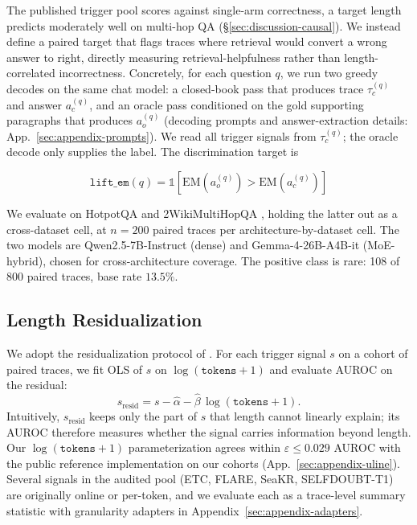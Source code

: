 \documentclass[11pt]{article}
\begin{document}
The published trigger pool scores against single-arm correctness, a target length predicts moderately well on multi-hop QA (\S\ref{sec:discussion-causal}). We instead define a paired target that flags traces where retrieval would convert a wrong answer to right, directly measuring retrieval-helpfulness rather than length-correlated incorrectness. Concretely, for each question $q$, we run two greedy decodes on the same chat model: a closed-book pass that produces trace $\tau_c^{(q)}$ and answer $a_c^{(q)}$, and an oracle pass conditioned on the gold supporting paragraphs that produces $a_o^{(q)}$ (decoding prompts and answer-extraction details: App.~\ref{sec:appendix-prompts}). We read all trigger signals from $\tau_c^{(q)}$; the oracle decode only supplies the label. The discrimination target is

\begin{equation}
\texttt{lift\_em}(q) = \mathbb{1}\!\left[\mathrm{EM}(a_o^{(q)}) > \mathrm{EM}(a_c^{(q)})\right]
\label{eq:lift-em}
\end{equation}

We evaluate on HotpotQA \citep{yang_hotpotqa_2018} and 2WikiMultiHopQA \citep{ho_constructing_2020}, holding the latter out as a cross-dataset cell, at $n{=}200$ paired traces per architecture-by-dataset cell. The two models are Qwen2.5-7B-Instruct (dense) and Gemma-4-26B-A4B-it (MoE-hybrid), chosen for cross-architecture coverage. The positive class is rare: 108 of 800 paired traces, base rate $13.5\%$.

\subsection{Length Residualization}
\label{sec:methods-residualization}

We adopt the residualization protocol of \citet{vashurin_uncertainty-line_2025}. For each trigger signal $s$ on a cohort of paired traces, we fit OLS of $s$ on $\log(\texttt{tokens}+1)$ and evaluate AUROC on the residual:
\begin{equation}
s_{\text{resid}} = s - \hat{\alpha} - \hat{\beta}\,\log(\texttt{tokens} + 1).
\label{eq:residualize}
\end{equation}
Intuitively, $s_{\text{resid}}$ keeps only the part of $s$ that length cannot linearly explain; its AUROC therefore measures whether the signal carries information beyond length. Our $\log(\texttt{tokens}+1)$ parameterization agrees within $\varepsilon \leq 0.029$ AUROC with the public reference implementation on our cohorts (App.~\ref{sec:appendix-uline}). Several signals in the audited pool (ETC, FLARE, SeaKR, SELFDOUBT-T1) are originally online or per-token, and we evaluate each as a trace-level summary statistic with granularity adapters in Appendix~\ref{sec:appendix-adapters}.
\end{document}
